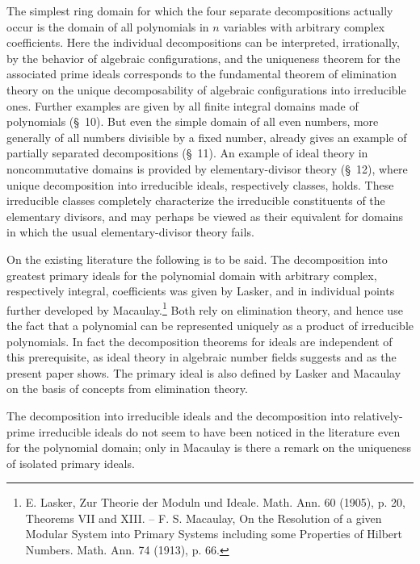 \documentclass[11pt]{article}
\begin{document}
The simplest ring domain for which the four separate decompositions actually occur is the domain of all polynomials in $n$ variables with arbitrary complex coefficients. Here the individual decompositions can be interpreted, irrationally, by the behavior of algebraic configurations, and the uniqueness theorem for the associated prime ideals corresponds to the fundamental theorem of elimination theory on the unique decomposability of algebraic configurations into irreducible ones. Further examples are given by all finite integral domains made of polynomials (\S~10). But even the simple domain of all even numbers, more generally of all numbers divisible by a fixed number, already gives an example of partially separated decompositions (\S~11). An example of ideal theory in noncommutative domains is provided by elementary-divisor theory (\S~12), where unique decomposition into irreducible ideals, respectively classes, holds. These irreducible classes completely characterize the irreducible constituents of the elementary divisors, and may perhaps be viewed as their equivalent for domains in which the usual elementary-divisor theory fails.

On the existing literature the following is to be said. The decomposition into greatest primary ideals for the polynomial domain with arbitrary complex, respectively integral, coefficients was given by Lasker, and in individual points further developed by Macaulay.\footnote{E. Lasker, Zur Theorie der Moduln und Ideale. Math. Ann. 60 (1905), p. 20, Theorems VII and XIII. -- F. S. Macaulay, On the Resolution of a given Modular System into Primary Systems including some Properties of Hilbert Numbers. Math. Ann. 74 (1913), p. 66.} Both rely on elimination theory, and hence use the fact that a polynomial can be represented uniquely as a product of irreducible polynomials. In fact the decomposition theorems for ideals are independent of this prerequisite, as ideal theory in algebraic number fields suggests and as the present paper shows. The primary ideal is also defined by Lasker and Macaulay on the basis of concepts from elimination theory.

The decomposition into irreducible ideals and the decomposition into relatively-prime irreducible ideals do not seem to have been noticed in the literature even for the polynomial domain; only in Macaulay is there a remark on the uniqueness of isolated primary ideals.
\end{document}
